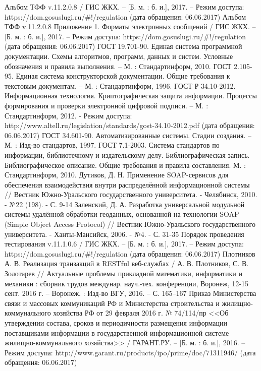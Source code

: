 \renewcommand{\refname}{Список использованных источников}

\begin{thebibliography}{99}
	 Альбом ТФФ v.11.2.0.8 / ГИС ЖКХ. – [Б. м. : б. и.], 2017. – Режим доступа: https://dom.gosuslugi.ru/\#!/regulation (дата обращения: 06.06.2017)
	 Альбом ТФФ v.11.2.0.8 Приложение 1. Форматы электронных сообщений / ГИС ЖКХ. – [Б. м. : б. и.], 2017. – Режим доступа: https://dom.gosuslugi.ru/\#!/regulation (дата обращения: 06.06.2017)
	 ГОСТ 19.701-90. Единая система программной документации. Схемы алгоритмов, программ, данных и систем. Условные обозначения и правила выполнения. – М. : Стандартинформ, 2010.
	 ГОСТ 2.105-95. Единая система конструкторской документации. Общие требования к текстовым документам. – М. : Стандартинформ, 1996.
	 ГОСТ Р 34.10-2012. Информационная технология. Криптографическая защита информации. Процессы формирования и проверки электронной цифровой подписи. – М. : Стандартинформ, 2012. - Режим доступа: http://www.altell.ru/legislation/standards/gost-34.10-2012.pdf (дата обращения: 06.06.2017)
	 ГОСТ 34.601-90. Автоматизированные системы. Стадии создания. – М. : Изд-во стандартов, 1997.
	 ГОСТ 7.1-2003. Система стандартов по информации, библиотечному и издательскому делу. Библиографическая запись. Библиографическое описание. Общие требования и правила составления.  М. : Стандартинформ, 2010.
	 Дутиков, Д. Н. Применение SOAP-сервисов для обеспечения взаимодействия внутри распределённой информационной системы // Вестник Южно-Уральского государственного университета. - Челябинск, 2010. - №22 (198). - С. 9-14
	 Заленский, Д. А. Разработка универсальной модульной системы удалённой обработки геоданных, основанной на технологии SOAP (Simple Object Access Protocol) // Вестник Южно-Уральского государственного университета. - Ханты-Мансийск, 2006. - №4. - С. 31-35
	 Порядок проведения тестирования v.11.1.0.6 / ГИС ЖКХ. – [Б. м. : б. и.], 2017. – Режим доступа: https://dom.gosuslugi.ru/\#!/regulation (дата обращения: 06.06.2017)
	 Плотников А. В. Реализация транзакций в RESTful веб-службах / А. В. Плотников, С. В. Золотарев // Актуальные проблемы прикладной математики, информатики и механики : сборник трудов междунар. науч.-тех. конференции, Воронеж, 12-15 сент. 2016 г. – Воронеж. : Изд-во ВГУ, 2016. – С. 165–167
	 Приказ Министерства связи и массовых коммуникаций РФ и Министерства строительства и жилищно-коммунального хозяйства РФ от 29 февраля 2016 г. № 74/114/пр <<Об утверждении состава, сроков и периодичности размещения информации поставщиками информации в государственной информационной системе жилищно-коммунального хозяйства>> / ГАРАНТ.РУ. – [Б. м. : б. и.], 2016. – Режим доступа: http://www.garant.ru/products/ipo/prime/doc/71311946/ (дата обращения: 06.06.2017)

\end{thebibliography}
